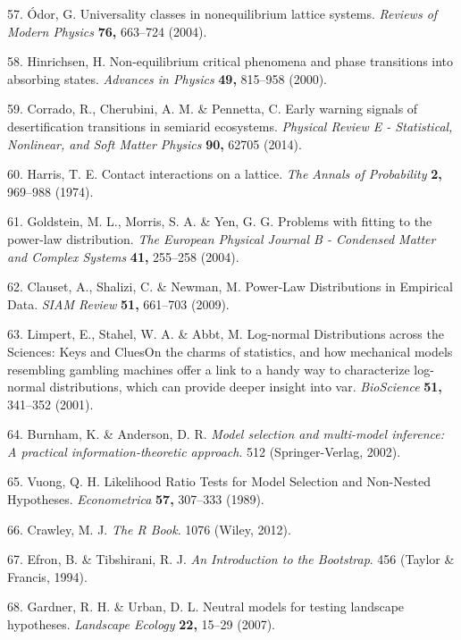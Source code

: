 \documentclass[]{article}
\begin{document}
\hypertarget{ref-Odor2004}{}
57. Ódor, G. Universality classes in nonequilibrium lattice systems.
\emph{Reviews of Modern Physics} \textbf{76,} 663--724 (2004).

\hypertarget{ref-Hinrichsen2000}{}
58. Hinrichsen, H. Non-equilibrium critical phenomena and phase
transitions into absorbing states. \emph{Advances in Physics}
\textbf{49,} 815--958 (2000).

\hypertarget{ref-Corrado2014}{}
59. Corrado, R., Cherubini, A. M. \& Pennetta, C. Early warning signals
of desertification transitions in semiarid ecosystems. \emph{Physical
Review E - Statistical, Nonlinear, and Soft Matter Physics} \textbf{90,}
62705 (2014).

\hypertarget{ref-Harris1974}{}
60. Harris, T. E. Contact interactions on a lattice. \emph{The Annals of
Probability} \textbf{2,} 969--988 (1974).

\hypertarget{ref-Goldstein2004}{}
61. Goldstein, M. L., Morris, S. A. \& Yen, G. G. Problems with fitting
to the power-law distribution. \emph{The European Physical Journal B -
Condensed Matter and Complex Systems} \textbf{41,} 255--258 (2004).

\hypertarget{ref-Clauset2009}{}
62. Clauset, A., Shalizi, C. \& Newman, M. Power-Law Distributions in
Empirical Data. \emph{SIAM Review} \textbf{51,} 661--703 (2009).

\hypertarget{ref-Limpert2001}{}
63. Limpert, E., Stahel, W. A. \& Abbt, M. Log-normal Distributions
across the Sciences: Keys and CluesOn the charms of statistics, and how
mechanical models resembling gambling machines offer a link to a handy
way to characterize log-normal distributions, which can provide deeper
insight into var. \emph{BioScience} \textbf{51,} 341--352 (2001).

\hypertarget{ref-Burnham2002}{}
64. Burnham, K. \& Anderson, D. R. \emph{Model selection and multi-model
inference: A practical information-theoretic approach}. 512
(Springer-Verlag, 2002).

\hypertarget{ref-Vuong1989}{}
65. Vuong, Q. H. Likelihood Ratio Tests for Model Selection and
Non-Nested Hypotheses. \emph{Econometrica} \textbf{57,} 307--333 (1989).

\hypertarget{ref-Crawley2012}{}
66. Crawley, M. J. \emph{The R Book}. 1076 (Wiley, 2012).

\hypertarget{ref-Efron1994}{}
67. Efron, B. \& Tibshirani, R. J. \emph{An Introduction to the
Bootstrap}. 456 (Taylor \& Francis, 1994).

\hypertarget{ref-Gardner2007}{}
68. Gardner, R. H. \& Urban, D. L. Neutral models for testing landscape
hypotheses. \emph{Landscape Ecology} \textbf{22,} 15--29 (2007).
\end{document}
